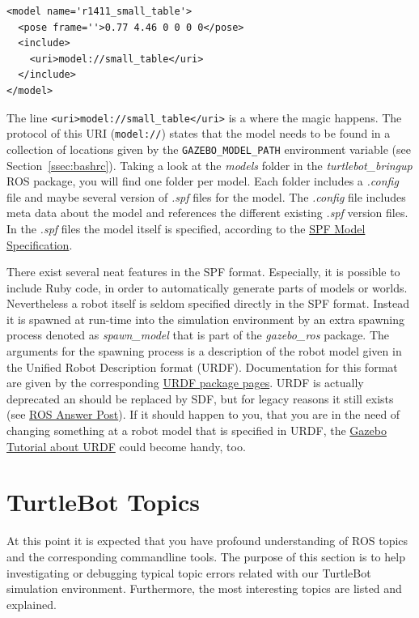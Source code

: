 \begin{Verbatim}[fontsize=\small]
<model name='r1411_small_table'>
  <pose frame=''>0.77 4.46 0 0 0 0</pose>
  <include>
    <uri>model://small_table</uri>
  </include>
</model>
\end{Verbatim}

The line \verb$<uri>model://small_table</uri>$ is a where the magic happens. The protocol of this URI (\verb$model://$) states that the model needs to be found in a collection of locations given by the \verb$GAZEBO_MODEL_PATH$ environment variable (see Section~\ref{ssec:bashrc}). Taking a look at the \emph{models} folder in the \emph{turtlebot\_bringup} ROS package, you will find one folder per model. Each folder includes a \emph{.config} file and maybe several version of \emph{.spf} files for the model. The \emph{.config} file includes meta data about the model and references the different existing \emph{.spf} version files. In the \emph{.spf} files the model itself is specified, according to the \href{http://sdformat.org/spec?ver=1.6&elem=model}{SPF Model Specification}.

There exist several neat features in the SPF format. Especially, it is possible to include Ruby code, in order to automatically generate parts of models or worlds. Nevertheless a robot itself is seldom specified directly in the SPF format. Instead it is spawned at run-time into the simulation environment by an extra spawning process denoted as \emph{spawn\_model} that is part of the \emph{gazebo\_ros} package. The arguments for the spawning process is a description of the robot model given in the Unified Robot Description format (URDF). Documentation for this format are given by the corresponding \href{http://wiki.ros.org/urdf/Tutorials}{URDF package pages}. URDF is actually deprecated an should be replaced by SDF, but for legacy reasons it still exists (see \href{http://answers.gazebosim.org/question/62/sdf-vs-urdf-what-should-one-use/}{ROS Answer Post}). If it should happen to you, that you are in the need of changing something at a robot model that is specified in URDF, the \href{http://gazebosim.org/tutorials/?tut=ros_urdf}{Gazebo Tutorial about URDF} could become handy, too.

\section{TurtleBot Topics}
\label{sec:TurtleBotTopics}

At this point it is expected that you have profound understanding of ROS topics and the corresponding commandline tools. The purpose of this section is to help investigating or debugging typical topic errors related with our TurtleBot simulation environment. Furthermore, the most interesting topics are listed and explained.

